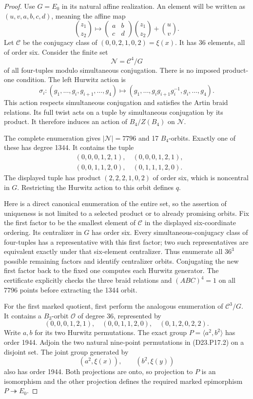\begin{proof}
Use $G=E_0$ in its natural affine realization. An element will
be written as $(u,v,a,b,c,d)$, meaning the affine map
\[
 \binom{z_1}{z_2}\longmapsto
 \begin{pmatrix}a&b\\c&d\end{pmatrix}\binom{z_1}{z_2}
 +\binom uv.
\]
Let $\mathcal C$ be the conjugacy class of
$(0,0,2,1,0,2)=\xi(x)$. It has 36 elements, all of order six.
Consider the finite set
\[
 \mathcal N=\mathcal C^4/G
\]
of all four-tuples modulo simultaneous conjugation. There is
no imposed product-one condition. The left Hurwitz action is
\[
 \sigma_i:(g_1,\ldots,g_i,g_{i+1},\ldots,g_4)
 \longmapsto
 (g_1,\ldots,g_i g_{i+1}g_i^{-1},g_i,\ldots,g_4).
 \tag{D23.P17.3}
\]
This action respects simultaneous conjugation and satisfies
the Artin braid relations. Its full twist acts on a tuple by
simultaneous conjugation by its product. It therefore induces
an action of $B_4/Z(B_4)$ on $\mathcal N$.

The complete enumeration gives $|\mathcal N|=7796$ and 17
$B_4$-orbits. Exactly one of these has degree 1344. It contains
the tuple
\[
\begin{split}
 &(0,0,0,1,2,1),\quad (0,0,0,1,2,1),\\
 &(0,0,1,1,2,0),\quad (0,1,1,1,2,0).
\end{split}
 \tag{D23.P17.4}
\]
The displayed tuple has product $(2,2,2,1,0,2)$ of order six,
which is noncentral in $G$. Restricting the Hurwitz action to
this orbit defines $q$.

Here is a direct canonical enumeration of the entire set,
so the assertion of uniqueness is not limited to a selected
product or to already promising orbits. Fix the first factor
to be the smallest element of $\mathcal C$ in the displayed
six-coordinate ordering. Its centralizer in $G$ has order six.
Every simultaneous-conjugacy class of four-tuples has a
representative with this first factor; two such representatives
are equivalent exactly under that six-element centralizer.
Thus enumerate all $36^3$ possible remaining factors and
identify centralizer orbits. Conjugating the new first factor
back to the fixed one computes each Hurwitz generator. The
certificate explicitly checks the three braid relations and
$(ABC)^4=1$ on all 7796 points before extracting the 1344 orbit.

For the first marked quotient, first perform the analogous
enumeration of $\mathcal C^3/G$. It contains a $B_3$-orbit
$\mathcal O$ of degree 36, represented by
\[
 (0,0,0,1,2,1),\quad (0,0,1,1,2,0),\quad
 (0,1,2,0,2,2).
 \tag{D23.P17.5}
\]
Write $a,b$ for its two Hurwitz permutations. The exact group
$P=\langle a^2,b^2\rangle$ has order 1944. Adjoin the two
natural nine-point permutations in (D23.P17.2) on a disjoint
set. The joint group generated by
\[
 (a^2,\xi(x)),\qquad(b^2,\xi(y))
\]
also has order 1944. Both projections are onto, so projection
to $P$ is an isomorphism and the other projection defines
the required marked epimorphism $P\twoheadrightarrow E_0$.


\end{proof}
